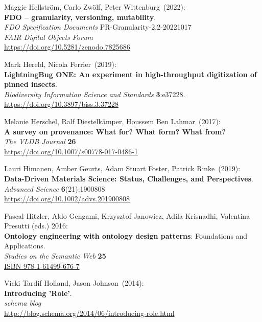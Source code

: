 \begin{thebibliography}{9}
Maggie Hellström, Carlo Zwölf, Peter Wittenburg~(2022): \\
\textbf{FDO -- granularity, versioning, mutability}. \\
\emph{FDO Specification Documents} PR-Granularity-2.2-20221017\\
\emph{FAIR Digital Objects Forum}\\
\url{https://doi.org/10.5281/zenodo.7825686}

Mark Hereld, Nicola Ferrier~(2019): \\
\textbf{LightningBug ONE: An experiment in high-throughput digitization of pinned insects}.\\
\emph{Biodiversity Information Science and Standards} \textbf{3}:e37228.\\
\url{https://doi.org/10.3897/biss.3.37228}

Melanie Herschel, Ralf Diestelkämper, Houssem Ben Lahmar~(2017): \\
\textbf{A survey on provenance: What for? What form? What from?}\\
\emph{The VLDB Journal} \textbf{26}\\
\url{https://doi.org/10.1007/s00778-017-0486-1}

Lauri Himanen, Amber Geurts, Adam Stuart Foster, Patrick Rinke~(2019): \\
\textbf{Data-Driven Materials Science: Status, Challenges, and Perspectives}.\\
\emph{Advanced Science} \textbf{6}(21):1900808\\
\url{https://doi.org/10.1002/advs.201900808}

Pascal Hitzler, Aldo Gengami, Krzysztof Janowicz, Adila Krisnadhi, Valentina Presutti (eds.) 2016:\\
\textbf{Ontology engineering with ontology design patterns}: Foundations and Applications.\\
\emph{Studies on the Semantic Web} \textbf{25}\\
\href{https://identifiers.org/isbn/9781614996767 }{ISBN 978-1-61499-676-7}

Vicki Tardif Holland, Jason Johnson~(2014): \\
\textbf{Introducing '{Role}'}.\\
\emph{schema blog}\\
\url{http://blog.schema.org/2014/06/introducing-role.html}


\end{thebibliography}
